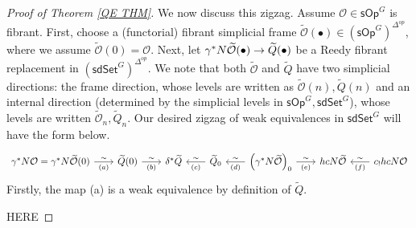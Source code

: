 \documentclass[a4paper,10pt
,draft
]{article}%
\numberwithin{equation}{section}
\numberwithin{figure}{section}
\theoremstyle{definition} %
\renewcommand{\O}{\ensuremath{\mathcal O}}
\newcommand{\1}{\ensuremath{\mathbbm 1}}%
\begin{document}
\begin{proof}[Proof of Theorem \ref{QE THM}]
We now discuss this zigzag. Assume 
$\mathcal{O} \in \mathsf{sOp}^G$ is fibrant.
First, choose a (functorial) fibrant simplicial frame
$\widetilde{\mathcal{O}}(\bullet) \in (\mathsf{sOp}^G)^{\Delta^{op}}$, where we assume $\widetilde{\mathcal{O}} (0) = \mathcal{O}$.
Next, let 
$\gamma^{\**} N \widetilde{\mathcal{O}}(\bullet) 
\to \widetilde{Q}(\bullet)$
be a Reedy fibrant replacement in  
$(\mathsf{sdSet}^G)^{\Delta^{op}}$.
We note that 
both $\widetilde{\O}$ and $\widetilde{Q}$
have two simplicial directions:
the frame direction, whose levels are written as
$\widetilde{\O}(n),\widetilde{Q}(n)$
and an internal direction
(determined by the simplicial levels in $\mathsf{sOp}^G,\mathsf{sdSet}^G$),
whose levels are written 
$\widetilde{\O}_n,\widetilde{Q}_n$.
Our desired zigzag of weak equivalences in $\mathsf{sdSet}^G$
will have the form below.
\begin{equation}\label{BIGZIG EQ}
\begin{tikzcd}[column sep =20pt]
	\gamma^{\**} N \mathcal{O} =
	\gamma^{\**} N \widetilde{\mathcal{O}} (0)
	\ar{r}{\sim}[swap]{(a)}
&
	\widetilde{Q}(0)
	\ar{r}{\sim}[swap]{(b)}
&
	\delta^{\**} \widetilde{Q}
	\ar[leftarrow]{r}{\sim}[swap]{(c)}
&	
	\widetilde{Q}_0
	\ar[leftarrow]{r}{\sim}[swap]{(d)}
&
	\left(\gamma^{\**} N \widetilde{\mathcal{O}}\right)_0
		\ar{r}{\sim}[swap]{(e)}
&
	hcN \widetilde{\mathcal{O}}
	\ar[leftarrow]{r}{\sim}[swap]{(f)}
&
	c_{!} hcN \mathcal{O}
\end{tikzcd}
\end{equation}
Firstly, the map (a) is a weak equivalence by definition of 
$\widetilde{Q}$.




{\color{red} HERE}


\end{proof}
\end{document}
